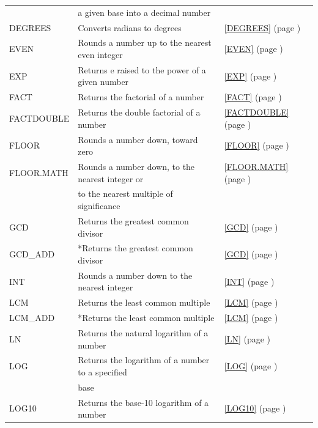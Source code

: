 \begin{center}
\begin{longtable}{l l l }
		& a given base into a decimal number &   \\
		DEGREES & Converts radians to degrees &  \ref{DEGREES} (page \pageref{DEGREES}) \index{Spreadsheet Functions!DEGREES} \\
		EVEN  & Rounds a number up to the nearest even integer &  \ref{EVEN} (page \pageref{EVEN}) \index{Spreadsheet Functions!EVEN} \\
		EXP   & Returns e raised to the power of a given number &  \ref{EXP} (page \pageref{EXP}) \index{Spreadsheet Functions!EXP} \\
		FACT  & Returns the factorial of a number &  \ref{FACT} (page \pageref{FACT}) \index{Spreadsheet Functions!FACT} \\
		FACTDOUBLE & Returns the double factorial of a number &  \ref{FACTDOUBLE} (page \pageref{FACTDOUBLE}) \index{Spreadsheet Functions!FACTDOUBLE} \\
		FLOOR & Rounds a number down, toward zero &  \ref{FLOOR} (page \pageref{FLOOR}) \index{Spreadsheet Functions!FLOOR} \\
		FLOOR.MATH & Rounds a number down, to the nearest integer or  &  \ref{FLOOR.MATH} (page \pageref{FLOOR.MATH}) \index{Spreadsheet Functions!FLOOR.MATH} \\
		& to the nearest multiple of significance &   \\
		GCD   & Returns the greatest common divisor &  \ref{GCD} (page \pageref{GCD}) \index{Spreadsheet Functions!GCD} \\
		GCD\_ADD   & *Returns the greatest common divisor &  \ref{GCD} (page \pageref{GCD}) \index{Spreadsheet Functions!GCD\_ADD} \\
		INT   & Rounds a number down to the nearest integer &  \ref{INT} (page \pageref{INT}) \index{Spreadsheet Functions!INT} \\
		LCM   & Returns the least common multiple &  \ref{LCM} (page \pageref{LCM}) \index{Spreadsheet Functions!LCM} \\
		LCM\_ADD   & *Returns the least common multiple &  \ref{LCM} (page \pageref{LCM}) \index{Spreadsheet Functions!LCM\_ADD} \\
		LN    & Returns the natural logarithm of a number &  \ref{LN} (page \pageref{LN}) \index{Spreadsheet Functions!LN} \\
		LOG   & Returns the logarithm of a number to a specified &  \ref{LOG} (page \pageref{LOG}) \index{Spreadsheet Functions!LOG} \\
		& base  &   \\
		LOG10 & Returns the base-10 logarithm of a number &  \ref{LOG10} (page \pageref{LOG10}) \index{Spreadsheet Functions!LOG10} \\

\end{longtable}
\end{center}
